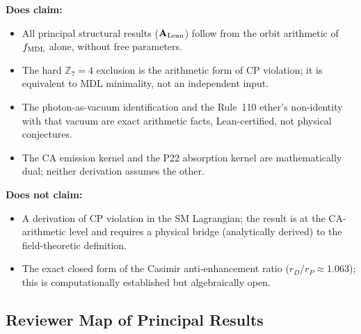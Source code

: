\documentclass[11pt]{article}
\theoremstyle{remark}
\newcommand{\CatAL}{\ensuremath{\textbf{A}_{\rm Lean}}}
\begin{document}
\begin{tcolorbox}[colback=blue!3,colframe=blue!50!black,
  title={\textbf{What this paper does and does not claim}},
  fonttitle=\bfseries,left=6pt,right=6pt,top=5pt,bottom=5pt]
\small
\textbf{Does claim:}
\begin{itemize}[nosep,leftmargin=1.2em]
\item All principal structural results ($\CatAL$) follow from the orbit
  arithmetic of $f_{\rm MDL}$ alone, without free parameters.
\item The hard $\mathbb{Z}_7 = 4$ exclusion is the arithmetic form of
  CP violation; it is equivalent to MDL minimality, not an independent input.
\item The photon-as-vacuum identification and the Rule~110 ether's non-identity
  with that vacuum are exact arithmetic facts, Lean-certified, not physical
  conjectures.
\item The CA emission kernel and the P22 absorption kernel are
  mathematically dual; neither derivation assumes the other.
\end{itemize}
\textbf{Does not claim:}
\begin{itemize}[nosep,leftmargin=1.2em]
\item A derivation of CP violation in the SM Lagrangian; the result is at
  the CA-arithmetic level and requires a physical bridge (analytically derived) to the
  field-theoretic definition.
\item The exact closed form of the Casimir anti-enhancement ratio
  ($r_D/r_P \approx 1.063$); this is computationally established but
  algebraically open.
\end{itemize}
\end{tcolorbox}

\subsection{Reviewer Map of Principal Results}
\end{document}
